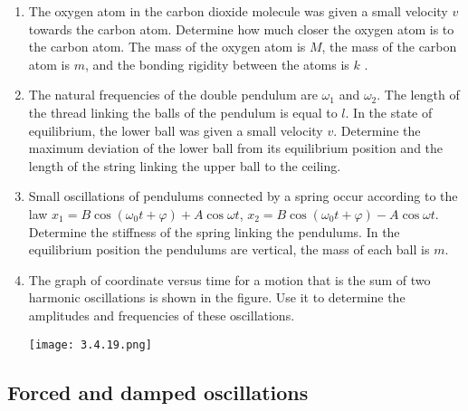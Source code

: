 \documentclass{article}
\begin{document}
\begin{enumerate}[label=3.4.\arabic*]
\item The oxygen atom in the carbon dioxide molecule was given a small velocity $v$ towards the carbon atom. Determine how much closer the oxygen atom is to the carbon atom. The mass of the oxygen atom is $M$, the mass of the carbon atom is $m$, and the bonding rigidity between the atoms is $k$
.
\item The natural frequencies of the double pendulum are $\omega_1$ and $\omega_2$. The length of the thread linking the balls of the pendulum is equal to $l$. In the state of equilibrium, the lower ball was given a small velocity $v$. Determine the maximum deviation of the lower ball from its equilibrium position and the length of the string linking the upper ball to the ceiling.

\item Small oscillations of pendulums connected by a spring occur according to the law $x_1 = B \cos{(\omega_0 t + \varphi)} + A \cos{\omega t}$, $x_2 = B \cos{(\omega_0 t + \varphi)} - A \cos{\omega t}$. Determine the stiffness of the spring linking the pendulums. In the equilibrium position the pendulums are vertical, the mass of each ball is $m$.

\item The graph of coordinate versus time for a motion that is the sum of two harmonic oscillations is shown in the figure. Use it to determine the amplitudes and frequencies of these oscillations.

\begin{center}
    \texttt{[image: 3.4.19.png]}
\end{center}


\end{enumerate}


\subsection{Forced and damped oscillations}
\end{document}
